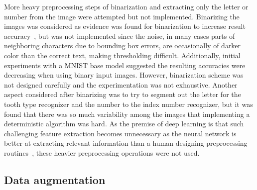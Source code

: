 \documentclass[english,twoside,openright]{UH_DS_MSc}
\begin{document}
More heavy preprocessing steps of binarization and extracting only the letter or number from the image were 
attempted but not implemented.
Binarizing the images was considered as evidence was found for binarization to increase result accuracy~\cite{9thuonPalm},
but was not implemented since the noise, in many cases
 parts of neighboring characters due to bounding box errors, are occasionally of darker 
color than the correct text, making thresholding difficult. Additionally,
 initial experiments with a MNIST base model suggested the resulting
accuracies were decreasing when using binary input images. However, binarization scheme was not designed carefully 
and the experimentation was not exhaustive.
Another aspect considered after binarizing was to try to segment out the letter for the tooth type recognizer 
and the number to the index number recognizer, but it was found that there was so much variability 
among the images that implementing a deterministic algorithm was hard. 
As the premise of deep learning is that such challenging feature extraction becomes unnecessary as the neural 
network is better at extracting relevant information than a human designing preprocessing routines~\cite{princebook}, these 
heavier preprocessing operations were not used.

\subsection{Data augmentation}
\label{sect:aug}
\end{document}
